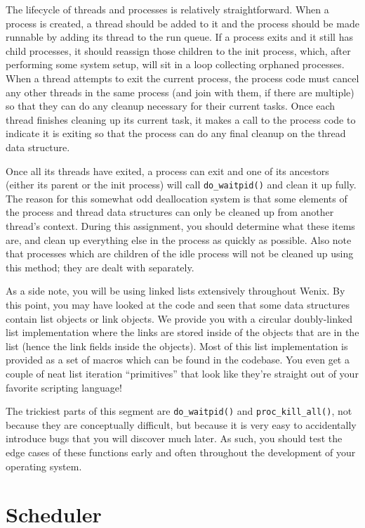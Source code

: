 The lifecycle of threads and processes is relatively straightforward. When a process is created, a thread should be added to it and the process should be made runnable by adding its thread to the run queue. If a process exits and it still has child processes, it should reassign those children to the init process, which, after performing some system setup, will sit in a loop collecting orphaned processes. When a thread attempts to exit the current process, the process code must cancel any other threads in the same process (and join with them, if there are multiple) so that they can do any cleanup necessary for their current tasks. Once each thread finishes cleaning up its current task, it makes a call to the process code to indicate it is exiting so that the process can do any final cleanup on the thread data structure.

Once all its threads have exited, a process can exit and one of its ancestors (either its parent or the init process) will call \texttt{do\_waitpid()} and clean it up fully. The reason for this somewhat odd deallocation system is that some elements of the process and thread data structures can only be cleaned up from another thread's context. During this assignment, you should determine what these items are, and clean up everything else in the process as quickly as possible. Also note that processes which are children of the idle process will not be cleaned up using this method; they are dealt with separately.

As a side note, you will be using linked lists extensively throughout Wenix. By this point, you may have looked at the code and seen that some data structures contain list objects or link objects. We provide you with a circular doubly-linked list implementation where the links are stored inside of the objects that are in the list (hence the link fields inside the objects). Most of this list implementation is provided as a set of macros which can be found in the codebase. You even get a couple of neat list iteration ``primitives'' that look like they're straight out of your favorite scripting language!

The trickiest parts of this segment are \texttt{do\_waitpid()} and \texttt{proc\_kill\_all()}, not because they are conceptually difficult, but because it is very easy to accidentally introduce bugs that you will discover much later. As such, you should test the edge cases of these functions early and often throughout the development of your operating system.

\section{Scheduler}

